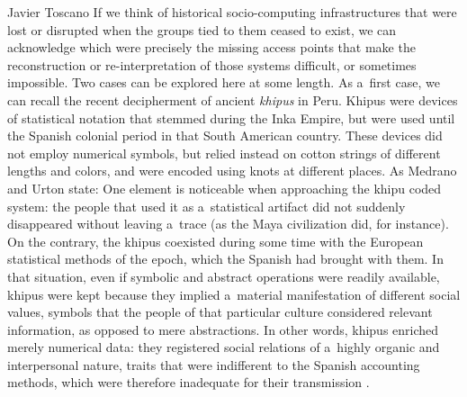 \begin{artengenv}{Javier Toscano}
If we think of historical socio-computing infrastructures that were lost or disrupted when the groups tied to them ceased to exist, we can acknowledge which were precisely the missing access points that make the reconstruction or re-interpretation of those systems difficult, or sometimes impossible. Two cases can be explored here at some length. As a~first case, we can recall the recent decipherment of ancient \textit{khipus} in Peru. Khipus were devices of statistical notation that stemmed during the Inka Empire, but were used until the Spanish colonial period in that South American country. These devices did not employ numerical symbols, but relied instead on cotton strings of different lengths and colors, and were encoded using knots at different places. As Medrano and Urton \parencite*[][p.2]{medrano_toward_2018} state: %
 One element is noticeable when approaching the khipu coded system: the people that used it as a~statistical artifact did not suddenly disappeared without leaving a~trace (as the Maya civilization did, for instance). On the contrary, the khipus coexisted during some time with the European statistical methods of the epoch, which the Spanish had brought with them. In that situation, even if symbolic and abstract operations were readily available, khipus were kept because they implied a~material manifestation of different social values, symbols that the people of that particular culture considered relevant information, as opposed to mere abstractions. In other words, khipus enriched merely numerical data: they registered social relations of a~highly organic and interpersonal nature, traits that were indifferent to the Spanish accounting methods, which were therefore inadequate for their transmission 
\parencite[][p.12]{medrano_toward_2018}.%



\end{artengenv}
